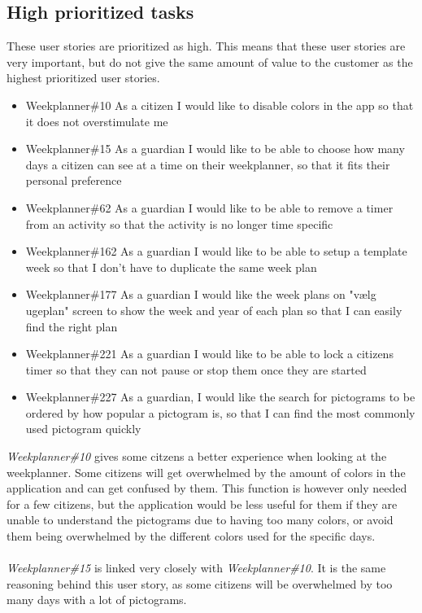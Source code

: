 \subsection{High prioritized tasks}
These user stories are prioritized as high. 
This means that these user stories are very important, but do not give the same amount of value to the customer as the highest prioritized user stories.
\begin{itemize}
    \item Weekplanner\#10 As a citizen I would like to disable colors in the app so that it does not overstimulate me
    \item Weekplanner\#15 As a guardian I would like to be able to choose how many days a citizen can see at a time on their weekplanner, so that it fits their personal preference 
    \item Weekplanner\#62 As a guardian I would like to be able to remove a timer from an activity so that the activity is no longer time specific
    \item Weekplanner\#162 As a guardian I would like to be able to setup a template week so that I don't have to duplicate the same week plan  
    \item Weekplanner\#177 As a guardian I would like the week plans on "vælg ugeplan" screen to show the week and year of each plan so that I can easily find the right plan 
    \item Weekplanner\#221 As a guardian I would like to be able to lock a citizens timer so that they can not pause or stop them once they are started
    \item Weekplanner\#227 As a guardian, I would like the search for pictograms to be ordered by how popular a pictogram is, so that I can find the most commonly used pictogram quickly
\end{itemize}
\noindent
\textit{Weekplanner\#10} gives some citzens a better experience when looking at the weekplanner. 
Some citizens will get overwhelmed by the amount of colors in the application and can get confused by them. 
This function is however only needed for a few citizens, but the application would be less useful for them if they are unable to understand the pictograms due to having too many colors, or avoid them being overwhelmed by the different colors used for the specific days.
\\\\
\textit{Weekplanner\#15} is linked very closely with \textit{Weekplanner\#10}. 
It is the same reasoning behind this user story, as some citizens will be overwhelmed by too many days with a lot of pictograms. 

